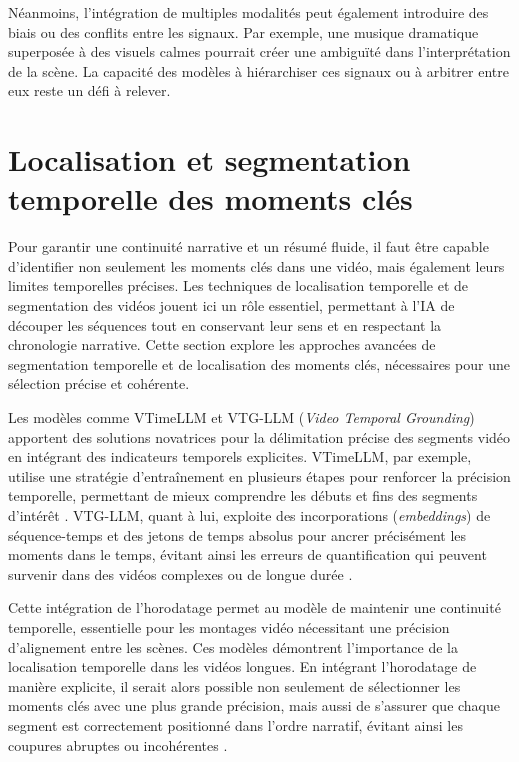 \documentclass[livre]{udes-genie-these}
\begin{document}
Néanmoins, l’intégration de multiples modalités peut également introduire des biais ou des conflits entre les signaux. Par exemple, une musique dramatique superposée à des visuels calmes pourrait créer une ambiguïté dans l’interprétation de la scène. La capacité des modèles à hiérarchiser ces signaux ou à arbitrer entre eux reste un défi à relever.

\section{Localisation et segmentation temporelle des moments clés}

Pour garantir une continuité narrative et un résumé fluide, il faut être capable d’identifier non seulement les moments clés dans une vidéo, mais également leurs limites temporelles précises. Les techniques de localisation temporelle et de segmentation des vidéos jouent ici un rôle essentiel, permettant à l’IA de découper les séquences tout en conservant leur sens et en respectant la chronologie narrative. Cette section explore les approches avancées de segmentation temporelle et de localisation des moments clés, nécessaires pour une sélection précise et cohérente. 

Les modèles comme VTimeLLM \cite{huang2024_vtimellm} et VTG-LLM (\textit{Video Temporal Grounding}) \cite{guo2024_vtgllm} apportent des solutions novatrices pour la délimitation précise des segments vidéo en intégrant des indicateurs temporels explicites. VTimeLLM, par exemple, utilise une stratégie d’entraînement en plusieurs étapes pour renforcer la précision temporelle, permettant de mieux comprendre les débuts et fins des segments d’intérêt \cite{han2024_clip}\cite{lei2021_clipbert}. VTG-LLM, quant à lui, exploite des incorporations (\textit{embeddings}) de séquence-temps et des jetons de temps absolus pour ancrer précisément les moments dans le temps, évitant ainsi les erreurs de quantification qui peuvent survenir dans des vidéos complexes ou de longue durée \cite{guo2024_vtgllm}\cite{you2023_ferret}. 

Cette intégration de l’horodatage permet au modèle de maintenir une continuité temporelle, essentielle pour les montages vidéo nécessitant une précision d’alignement entre les scènes. Ces modèles démontrent l’importance de la localisation temporelle dans les vidéos longues. En intégrant l’horodatage de manière explicite, il serait alors possible non seulement de sélectionner les moments clés avec une plus grande précision, mais aussi de s’assurer que chaque segment est correctement positionné dans l’ordre narratif, évitant ainsi les coupures abruptes ou incohérentes \cite{lei2021_clipbert}\cite{anonymous2017_localizing}. 
\end{document}
